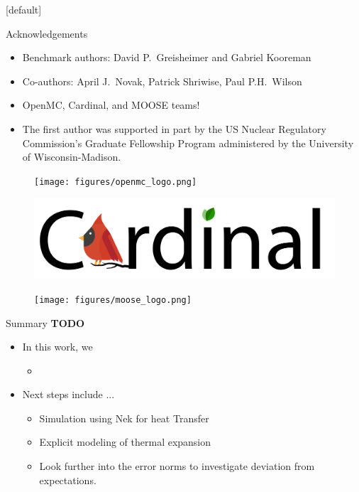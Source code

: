 \documentclass[9pt,t]{beamer}
\makeatletter
\newenvironment{withoutheadline}{
       \setbeamertemplate{headline}[default]
       \def\beamer@entrycode{\vspace*{-\headheight}}
    }{}
\makeatother
\begin{document}
\begin{withoutheadline}
    \begin{frame}{Acknowledgements}
        \begin{itemize}
            \item Benchmark authors: David P.~Greisheimer and Gabriel Kooreman
            \item Co-authors: April J.~Novak, Patrick Shriwise, Paul P.H.~Wilson
            \item OpenMC, Cardinal, and MOOSE teams!
            \item The first author was supported in part by the US Nuclear Regulatory Commission's Graduate Fellowship Program administered by the University of Wisconsin-Madison.
        \end{itemize}
        \begin{figure}[H]
            \centering
            \texttt{[image: figures/openmc\_logo.png]}
        \end{figure}
        \begin{figure}[H]
            \centering
            \includegraphics[width=0.5\linewidth]{figures/cardinal_logo.png}
        \end{figure}
        \begin{figure}[H]
            \centering
            \texttt{[image: figures/moose\_logo.png]}
        \end{figure}
    \end{frame}
\end{withoutheadline}

\begin{frame}{Summary \textbf{TODO}}
    \begin{itemize}
        \item In this work, we
        \begin{itemize}
            \item
        \end{itemize}
        \item Next steps include ...
        \begin{itemize}
            \item Simulation using Nek for heat Transfer
            \item Explicit modeling of thermal expansion
            \item Look further into the error norms to investigate deviation from expectations.
        \end{itemize}
    \end{itemize}
\end{frame}
\end{document}
